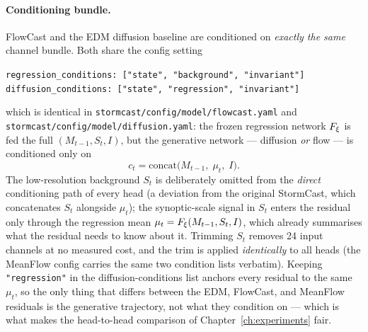 \paragraph{Conditioning bundle.} FlowCast and the EDM diffusion baseline are conditioned on \emph{exactly the same} channel bundle. Both share the config setting
\begin{center}
\texttt{regression\_conditions: ["state", "background", "invariant"]}\\
\texttt{diffusion\_conditions: ["state", "regression", "invariant"]}
\end{center}
which is identical in \texttt{stormcast/config/model/flowcast.yaml} and \texttt{stormcast/config/model/diffusion.yaml}: the frozen regression network $F_{\xi}$ is fed the full $(M_{t-1}, S_t, I)$, but the generative network --- diffusion \emph{or} flow --- is conditioned only on
\begin{equation}
  c_t = \mathrm{concat}\bigl(M_{t-1},\; \mu_t,\; I\bigr).
\end{equation}
The low-resolution background $S_t$ is deliberately omitted from the \emph{direct} conditioning path of every head (a deviation from the original StormCast, which concatenates $S_t$ alongside $\mu_t$); the synoptic-scale signal in $S_t$ enters the residual only through the regression mean $\mu_t = F_{\xi}(M_{t-1}, S_t, I)$, which already summarises what the residual needs to know about it. Trimming $S_t$ removes 24 input channels at no measured cost, and the trim is applied \emph{identically} to all heads (the MeanFlow config carries the same two condition lists verbatim). Keeping \texttt{"regression"} in the diffusion-conditions list anchors every residual to the same $\mu_t$, so the only thing that differs between the EDM, FlowCast, and MeanFlow residuals is the generative trajectory, not what they condition on --- which is what makes the head-to-head comparison of Chapter~\ref{ch:experiments} fair.

